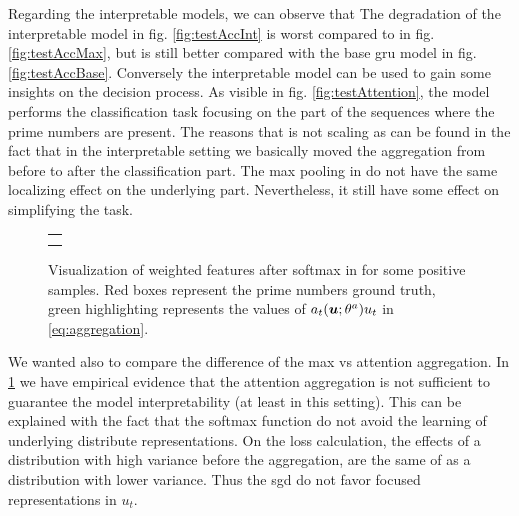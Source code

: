 Regarding the interpretable models, we can observe that
The degradation of the interpretable \maxi{} model in
fig. \ref{fig:testAccInt} is worst 
compared to \maxp{} in fig. \ref{fig:testAccMax},
but is still better compared with the base \ac{gru} model in
fig. \ref{fig:testAccBase}. Conversely the interpretable model can be
used to gain
some insights on the decision process. As visible in
fig. \ref{fig:testAttention}, the model performs the classification
task focusing on 
the part of the sequences where the prime numbers are present. The
reasons that \maxi{} is not scaling as \maxp{} can be found in the fact
that in the interpretable setting we basically moved the aggregation
from before to after the classification part. The max pooling in
\maxi{} do not have the same localizing effect on the underlying
part. Nevertheless, it still have some effect on simplifying the
task.

\begin{figure}
  \centering
  \footnotesize
  \begin{tabular}{|p{\floatwidth}|}
    \hline
    \\
    \hline
    \\
    \hline
    \\
    \hline
  \end{tabular}
  \caption{Visualization of weighted features after softmax in
    \softmaxi{} for some
    positive samples. Red boxes represent the prime numbers ground
    truth, green highlighting represents the values of
    $a_t(\bm{u};\theta^a)u_t$ in
    \eqref{eq:aggregation}.}
  \label{fig:testAttentionSoft}
\end{figure}
We wanted also to compare the difference of the max vs attention
aggregation. In 
\cref{fig:testAttentionSoft} we have empirical evidence that the
attention aggregation is not sufficient to guarantee the model
interpretability (at least in this setting). This can be explained
with the fact that the softmax function do 
not avoid the learning of underlying
distribute representations. 
On the loss calculation, the effects of a
distribution with high variance before the aggregation, are the 
same of as a distribution with lower variance. Thus the \ac{sgd} do
not favor focused representations in $u_t$.

